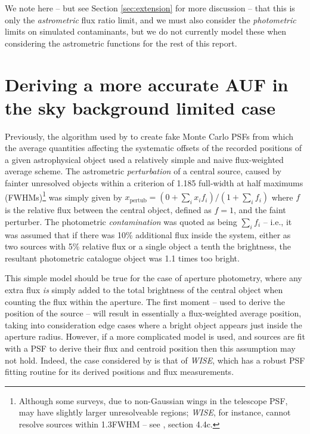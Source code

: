 \documentclass[fleqn,usenatbib]{mnras}
\begin{document}
We note here -- but see Section \ref{sec:extension} for more discussion -- that this is only the \textit{astrometric} flux ratio limit, and we must also consider the \textit{photometric} limits on simulated contaminants, but we do not currently model these when considering the astrometric functions for the rest of this report.

\section{Deriving a more accurate AUF in the sky background limited case}
\label{sec:loglfit}
Previously, the algorithm used by \cite{2018MNRAS.481.2148W} to create fake Monte Carlo PSFs from which the average quantities affecting the systematic offsets of the recorded positions of a given astrophysical object used a relatively simple and naive flux-weighted average scheme. The astrometric \textit{perturbation} of a central source, caused by fainter unresolved objects within a \citet{1880MNRAS..40..254R} criterion of 1.185 full-width at half maximums (FWHMs)\footnote{Although some surveys, due to non-Gaussian wings in the telescope PSF, may have slightly larger unresolveable regions; \textit{WISE}, for instance, cannot resolve sources within 1.3FWHM -- see \citet{Cutri:2012aa}, section 4.4c.} was simply given by $x_\mathrm{pertub} = (0 + \sum_i x_i f_i) / (1 + \sum_i f_i)$ where $f$ is the relative flux between the central object, defined as $f=1$, and the faint perturber. The photometric \textit{contamination} was quoted as being $\sum_i f_i$ -- i.e., it was assumed that if there was 10\% additional flux inside the system, either as two sources with 5\% relative flux or a single object a tenth the brightness, the resultant photometric catalogue object was 1.1 times too bright.

This simple model should be true for the case of aperture photometry, where any extra flux \textit{is} simply added to the total brightness of the central object when counting the flux within the aperture. The first moment -- used to derive the position of the source -- will result in essentially a flux-weighted average position, taking into consideration edge cases where a bright object appears just inside the aperture radius. However, if a more complicated model is used, and sources are fit with a PSF to derive their flux and centroid position then this assumption may not hold. Indeed, the case considered by \citet{2018MNRAS.481.2148W} is that of \textit{WISE}, which has a robust PSF fitting routine for its derived positions and flux measurements.
\end{document}
